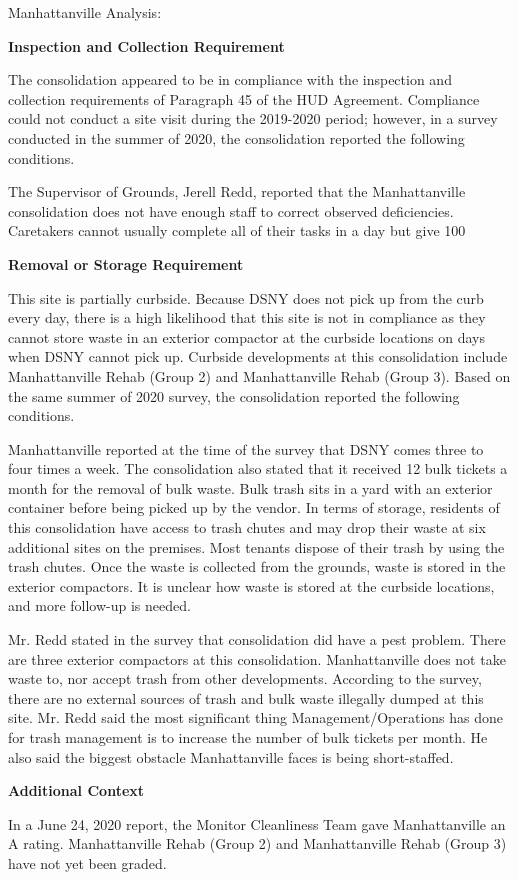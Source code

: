 Manhattanville Analysis: 

\textbf{Inspection and Collection Requirement} 

 

The consolidation appeared to be in compliance with the inspection and collection requirements of Paragraph 45 of the HUD Agreement. Compliance could not conduct a site visit during the 2019-2020 period; however, in a survey conducted in the summer of 2020, the consolidation reported the following conditions.

The Supervisor of Grounds, Jerell Redd, reported that the Manhattanville consolidation does not have enough staff to correct observed deficiencies. Caretakers cannot usually complete all of their tasks in a day but give 100%

\textbf{Removal or Storage Requirement}  

 

This site is partially curbside. Because DSNY does not pick up from the curb every day, there is a high likelihood that this site is not in compliance as they cannot store waste in an exterior compactor at the curbside locations on days when DSNY cannot pick up. Curbside developments at this consolidation include Manhattanville Rehab (Group 2) and  Manhattanville Rehab (Group 3).  Based on the same summer of  2020  survey, the consolidation reported the following conditions.

 

Manhattanville reported at the time of the survey that DSNY comes three to four times a week. The consolidation also stated that it received 12 bulk tickets a month for the removal of bulk waste. Bulk trash sits in a yard with an exterior container before being picked up by the vendor. In terms of storage, residents of this consolidation have access to trash chutes and may drop their waste at six additional sites on the premises.  Most tenants dispose of their trash by using the trash chutes. Once the waste is collected from the grounds, waste is stored in the exterior compactors. It is unclear how waste is stored at the curbside locations, and more follow-up is needed.

 

Mr. Redd stated in the survey that consolidation did have a pest problem. There are three exterior compactors at this consolidation. Manhattanville does not take waste to, nor accept trash from other developments. According to the survey, there are no external sources of trash and bulk waste illegally dumped at this site. Mr.  Redd said the most significant thing Management/Operations has done for trash management is to increase the number of bulk tickets per month. He also said the biggest obstacle Manhattanville faces is being short-staffed.

\textbf{Additional Context}  

In a June 24, 2020 report, the Monitor Cleanliness Team gave Manhattanville an A rating. Manhattanville Rehab (Group 2) and  Manhattanville Rehab (Group 3) have not yet been graded.

 